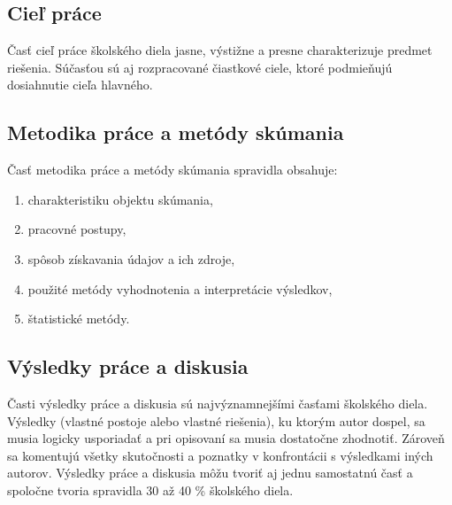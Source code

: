 \subsection{Cieľ práce}
Časť cieľ práce  školského diela jasne, výstižne a presne charakterizuje predmet 
riešenia. Súčasťou sú aj rozpracované čiastkové ciele, ktoré podmieňujú dosiahnutie 
cieľa hlavného. 

\subsection{Metodika práce a metódy skúmania}
Časť metodika práce a metódy skúmania spravidla obsahuje:
\begin{enumerate}
\item  charakteristiku objektu skúmania,  
\item  pracovné postupy, 
\item  spôsob získavania údajov a ich zdroje, 
\item  použité metódy vyhodnotenia a interpretácie výsledkov,
\item  štatistické metódy.
\end{enumerate}

\subsection{Výsledky práce a diskusia}
Časti výsledky práce a diskusia sú najvýznamnejšími  časťami  školského diela. 
Výsledky (vlastné postoje alebo vlastné riešenia), ku ktorým autor dospel, sa musia 
logicky usporiadať a pri opisovaní sa musia dostatočne zhodnotiť. Zároveň sa 
komentujú všetky skutočnosti a poznatky v konfrontácii s výsledkami iných autorov. 
Výsledky práce a diskusia môžu tvoriť aj jednu samostatnú časť  a spoločne tvoria 
spravidla 30 až 40 \% školského diela.  

